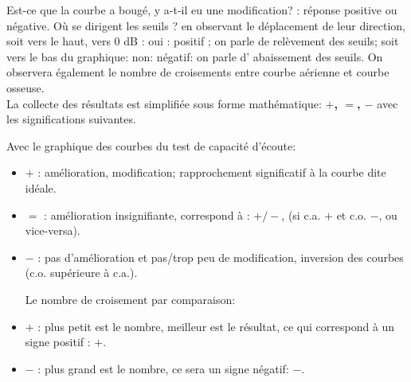 Est-ce que la courbe a bougé, y a-t-il eu une modification? : réponse  positive ou négative.
Où se dirigent les seuils ? 
en observant le déplacement de leur direction, soit vers le haut, vers 0 dB : oui : positif ; on parle de 
relèvement des seuils; soit vers le bas du graphique: non: négatif: on parle d' abaissement des seuils.
On observera  également  le nombre de croisements entre courbe aérienne et courbe osseuse.
\\
La collecte des résultats est simplifiée sous 
forme 
mathématique:  \textbf{ $+$, $=$, $-$ } avec les significations suivantes.

Avec  le graphique des courbes du test de capacité d'écoute: 
\begin{itemize}
	\item$+$   : amélioration, modification;  rapprochement significatif à la courbe dite idéale.
	\item$=$   : amélioration insignifiante, correspond à : $+/-$, (si c.a. $ + $ et c.o. $-$, ou vice-versa).
	\item$-$   : pas d'amélioration et pas/trop peu  de modification, inversion
	des courbes (c.o. supérieure à c.a.).
	
	Le nombre de croisement par comparaison:
	\item $+$ : plus petit est le nombre, meilleur est le résultat, ce qui correspond à un signe positif : $+$.
	\item$-$   : plus grand est le nombre, ce sera un signe négatif: $-$.
\end{itemize}


